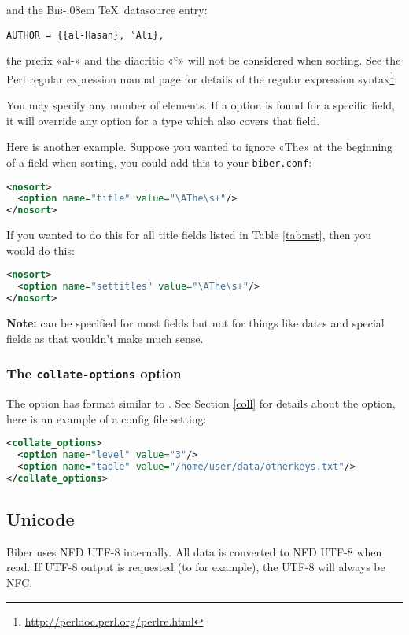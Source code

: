 \documentclass{ltxdockit}
\def\BibTeX{\textsc{Bib}\kern-.08em \TeX}
\newcommand*{\biber}{Biber\xspace}
\begin{document}
\noindent and the \BibTeX\ datasource entry:

\begin{verbatim}
AUTHOR = {{al-Hasan}, ʿAlī},
\end{verbatim}

\noindent the prefix «al-» and the diacritic «ʿ» will not be considered
when sorting. See the Perl regular expression manual page for
details of the regular expression syntax\footnote{\url{http://perldoc.perl.org/perlre.html}}.

You may specify any number of  elements. If a
 option is found for a specific field, it will override
any option for a type which also covers that field.

Here is another example. Suppose you wanted to ignore «The» at the
beginning of a  field when sorting, you could add this to your
\verb+biber.conf+:

\begin{lstlisting}[language=xml]
<nosort>
  <option name="title" value="\AThe\s+"/>
</nosort>
\end{lstlisting}

\noindent If you wanted to do this for all title fields listed in Table
\ref{tab:nst}, then you would do this:

\begin{lstlisting}[language=xml]
<nosort>
  <option name="settitles" value="\AThe\s+"/>
</nosort>
\end{lstlisting}

\noindent \textbf{Note:}  can be specified for most fields but
not for things like dates and special fields as that wouldn't make much sense.
\bigskip
\subsubsection{The \texttt{collate-options} option}

The  option has format similar to
. See Section \ref{coll} for details about the option,
here is an example of a config file setting:

\begin{lstlisting}[language=xml]
<collate_options>
  <option name="level" value="3"/>
  <option name="table" value="/home/user/data/otherkeys.txt"/>
</collate_options>
\end{lstlisting}
\bigskip
\subsection{Unicode}
\biber uses NFD UTF-8 internally. All data is converted to NFD UTF-8
when read. If UTF-8 output is requested (to  for example),
the UTF-8 will always be NFC.
\bigskip
\end{document}
